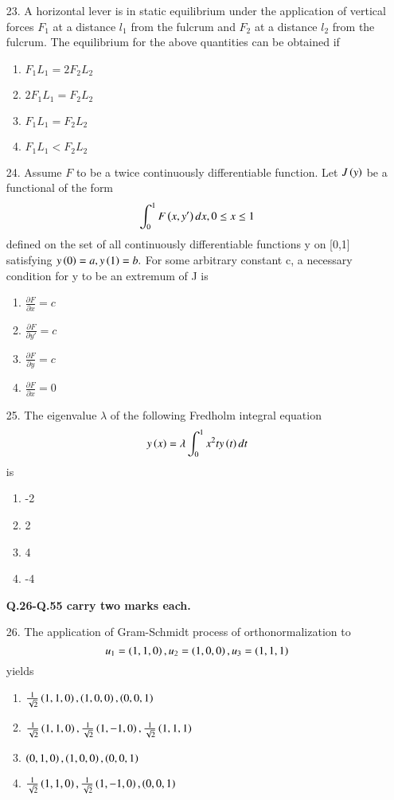 \documentclass[journal]{IEEEtran}
\begin{document}
\begin{enumerate}
\begin{enumerate}[label=(\Alph*)]
    \end{enumerate}
    \item[23.] A horizontal lever is in static equilibrium under the application of vertical forces $F_1$ at a distance $l_1$ from the fulcrum and $F_2$ at a distance $l_2$ from the fulcrum. The equilibrium for the above quantities can be obtained if 
     \begin{enumerate}[label=(\Alph*)]
        \item $F_1L_1 = 2F_2L_2$
        \item $2F_1L_1 = F_2L_2$
        \item $F_1L_1 = F_2L_2$
        \item $F_1L_1 < F_2L_2$
     \end{enumerate}
    \item[24.] Assume $F$ to be a twice continuously differentiable function. Let $J\left(y\right)$ be a functional of the form $$\int_{0}^{1}F\left(x,y'\right)dx, 0\leq x\leq 1$$ defined on the set of all continuously differentiable functions y on [0,1] satisfying $y\left(0\right)=a,y\left(1\right)=b.$ For some arbitrary constant c, a necessary condition for y to be an extremum of J is  
    \begin{enumerate}[label=(\Alph*)]
        \item $\frac{\partial F}{\partial x}=c$
        \item $\frac{\partial F}{\partial y'}=c$
        \item $\frac{\partial F}{\partial y}=c$
        \item $\frac{\partial F}{\partial x}=0$
    \end{enumerate}
    \item[25.] The eigenvalue $\lambda$ of the following Fredholm integral equation $$y\left(x\right)= \lambda\int_{0}^{1}x^2ty\left(t\right)dt$$ is
    \begin{enumerate}[label=(\Alph*)]
        \item -2
        \item 2
        \item 4
        \item -4
    \end{enumerate}
    \textbf{Q.26-Q.55 carry two marks each.}
    \item[26.] The application of Gram-Schmidt process of orthonormalization to $$u_1 = \left(1,1,0\right), u_2=\left(1,0,0\right), u_3 = \left(1,1,1\right)$$ yields
    \begin{enumerate}[label=(\Alph*)]
        \item $\frac{1}{\sqrt{2}}\left(1,1,0\right),\left(1,0,0\right),\left(0,0,1\right)$
        \item $\frac{1}{\sqrt{2}}\left(1,1,0\right),\frac{1}{\sqrt{2}}\left(1,-1,0\right),\frac{1}{\sqrt{2}}\left(1,1,1\right)$ 
        \item $\left(0,1,0\right),\left(1,0,0\right),\left(0,0,1\right)$
        \item $\frac{1}{\sqrt{2}}\left(1,1,0\right),\frac{1}{\sqrt{2}}\left(1,-1,0\right),\left(0,0,1\right)$ 
    \end{enumerate} 
\end{enumerate}
\end{document}
